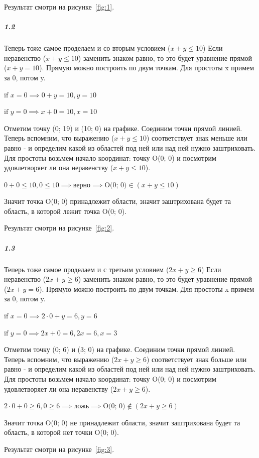 Результат смотри на рисунке~\ref{fig:1}.


\subparagraph{1.2}
Теперь тоже самое проделаем и со вторым условием ($x+y \leq 10$)
Если неравенство ($x+y \leq 10$) заменить знаком равно, то это будет уравнение прямой ($x+y = 10$).
Прямую можно построить по двум точкам.
Для простоты x примем за 0, потом y.

$
\text{if } x = 0 \implies 0+y=10, y=10
$

$
\text{if } y = 0 \implies x+0=10, x=10
$

Отметим точку (0; 19) и (10; 0) на графике.
Соединим точки прямой линией.
Теперь вспомним, что выражению ($x+y \leq 10$) соответствует знак меньше или равно
- и определим какой из областей под ней или над ней нужно заштриховать.
Для простоты возьмем начало координат: точку O(0; 0)
и посмотрим удовлетворяет ли она неравенству ($x+y \leq 10$).

$
0+0 \leq 10, 0 \leq 10 \implies \text{верно} \implies \text{O(0; 0)} \in (x+y\leq 10)
$

Значит точка O(0; 0) принадлежит области, значит заштрихована будет та область, в которой лежит точка O(0; 0).

Результат смотри на рисунке~\ref{fig:2}.

\subparagraph{1.3}
Теперь тоже самое проделаем и с третьим условием ($2x+y \geq 6$)
Если неравенство ($2x+y \geq 6$) заменить знаком равно, то это будет уравнение прямой ($2x+y = 6$).
Прямую можно построить по двум точкам.
Для простоты x примем за 0, потом y.

$
\text{if } x = 0 \implies 2\cdot0+y=6, y=6
$

$
\text{if } y = 0 \implies 2x+0=6, 2x=6, x=3
$

Отметим точку (0; 6) и (3; 0) на графике.
Соединим точки прямой линией.
Теперь вспомним, что выражению ($2x+y \geq 6$) соответствует знак больше или равно
- и определим какой из областей под ней или над ней нужно заштриховать.
Для простоты возьмем начало координат: точку O(0; 0)
и посмотрим удовлетворяет ли она неравенству ($2x+y \geq 6$).

$
2\cdot0+0 \geq 6, 0 \geq 6 \implies \text{ложь} \implies \text{O(0; 0)} \notin (2x+y \geq 6)
$

Значит точка O(0; 0) не принадлежит области, значит заштрихована будет та область, в которой нет точки O(0; 0).

Результат смотри на рисунке~\ref{fig:3}.


